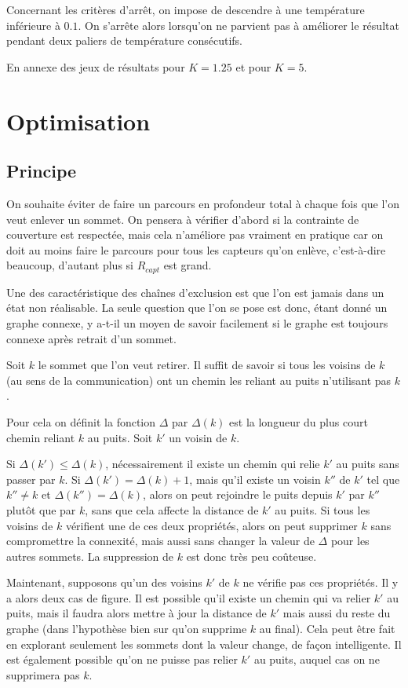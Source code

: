 \documentclass[12pt,a4paper]{article}
\begin{document}
Concernant les critères d'arrêt, on impose de descendre à une température inférieure à $0.1$. On s'arrête alors lorsqu'on ne parvient pas à améliorer le résultat pendant deux paliers de température consécutifs.

En annexe des jeux de résultats pour $K=1.25$ et pour $K=5$.
\section{Optimisation}
\subsection{Principe}
On souhaite éviter de faire un parcours en profondeur total à chaque fois que l'on veut enlever un sommet. On pensera à vérifier d'abord si la contrainte de couverture est respectée, mais cela n'améliore pas vraiment en pratique car on doit au moins faire le parcours pour tous les capteurs qu'on enlève, c'est-à-dire beaucoup, d'autant plus si $R_{capt}$ est grand.

Une des caractéristique des chaînes d'exclusion est que l'on est jamais dans un état non réalisable. La seule question que l'on se pose est donc, étant donné un graphe connexe, y a-t-il un moyen de savoir facilement si le graphe est toujours connexe après retrait d'un sommet. 

Soit $k$ le sommet que l'on veut retirer. Il suffit de savoir si tous les voisins de $k$ (au sens de la communication) ont un chemin les reliant au puits n'utilisant pas $k$.

Pour cela on définit la fonction $\Delta$ par $\Delta (k)$ est la longueur du plus court chemin reliant $k$ au puits. Soit $k'$ un voisin de $k$. 

Si $\Delta(k')\leq \Delta(k)$, nécessairement il existe un chemin qui relie $k'$ au puits sans passer par $k$. Si $\Delta(k')=\Delta(k)+1$, mais qu'il existe un voisin $k''$ de $k'$ tel que $k''\neq k$ et $\Delta(k'')=\Delta(k)$, alors on peut rejoindre le puits depuis $k'$ par $k''$ plutôt que par $k$, sans que cela affecte la distance de $k'$ au puits. Si tous les voisins de $k$ vérifient une de ces deux propriétés, alors on peut supprimer $k$ sans compromettre la connexité, mais aussi sans changer la valeur de $\Delta$ pour les autres sommets. La suppression de $k$ est donc très peu coûteuse. 

Maintenant, supposons qu'un des voisins $k'$ de $k$ ne vérifie pas ces propriétés. Il y a alors deux cas de figure. Il est possible qu'il existe un chemin qui va relier $k'$ au puits, mais il faudra alors mettre à jour la distance de $k'$ mais aussi du reste du graphe (dans l'hypothèse bien sur qu'on supprime $k$ au final). Cela peut être fait en explorant seulement les sommets dont la valeur change, de façon intelligente. Il est également possible qu'on ne puisse pas relier $k'$ au puits, auquel cas on ne supprimera pas $k$.
\end{document}
